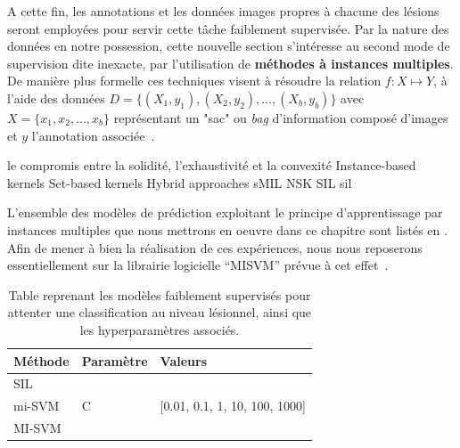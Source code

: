 A cette fin, les annotations et les données images propres à chacune des lésions seront employées pour servir cette tâche faiblement supervisée. Par la nature des données en notre possession, cette nouvelle section s'intéresse au second mode de supervision dite inexacte, par l'utilisation de \textbf{méthodes à instances multiples}. De manière plus formelle ces techniques visent à résoudre la relation $f: X \mapsto Y$, à l'aide des données $D=\{(X_1,y_1),(X_2,y_2),\ldots,(X_b,y_b)\}$ avec $X=\{x_1,x_2,\ldots,x_b\}$ représentant un "sac" ou \textit{bag} d'information composé d'images et $y$ l'annotation associée~\cite{foulds2010}.\par

le compromis entre la solidité, l'exhaustivité et la convexité
Instance-based kernels
Set-based kernels
Hybrid approaches
sMIL
NSK
SIL
\gls{sil}
\cite{Andrews2002}

L'ensemble des modèles de prédiction exploitant le principe d'apprentissage par instances multiples que nous mettrons en oeuvre dans ce chapitre sont listés en . Afin de mener à bien la réalisation de ces expériences, nous nous reposerons essentiellement sur la librairie logicielle “MISVM” prévue à cet effet~\cite{Doran2014}.\par

\begin{table}[H]
    \centering
    \begin{tabular}{lll}
    \toprule
    \textbf{Méthode}    & \textbf{Paramètre}& \textbf{Valeurs}                                  \\ \midrule
    SIL                 & \multirow{3}{*}{C}& \multirow{3}{*}{[0.01, 0.1, 1, 10, 100, 1000]}    \\ \cline{1-1}
    mi-SVM              &                   &                                                   \\ \cline{1-1} 
    MI-SVM              &                   &                                                   \\ \bottomrule 
    \end{tabular}    
    \caption{Table reprenant les modèles faiblement supervisés pour attenter une classification au niveau lésionnel, ainsi que les hyperparamètres associés.}
    \label{tab:patient_decision_weak_hyperparameters}
\end{table}\par

